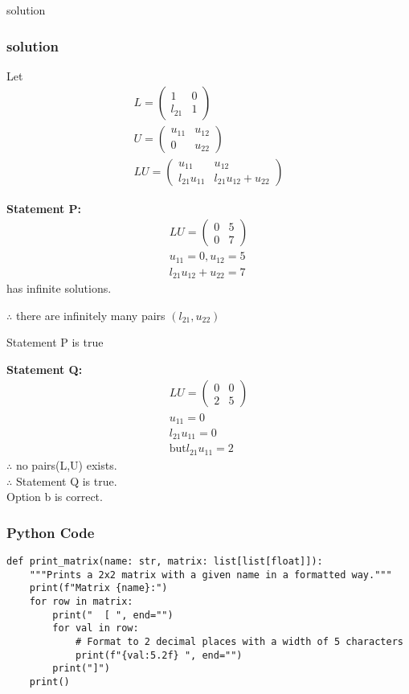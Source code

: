 \documentclass{beamer}
\begin{document}
\begin{frame}{solution}
    \frametitle{solution}
Let 
\begin{align}
L = \begin{pmatrix} 1 & 0 \\ l_{21} & 1 \end{pmatrix}\\
U = \begin{pmatrix} u_{11} & u_{12} \\ 0 & u_{22} \end{pmatrix}\\
LU = \begin{pmatrix} u_{11} & u_{12} \\ l_{21}u_{11} & l_{21}u_{12} + u_{22} \end{pmatrix}
\end{align}
\end{frame}
\begin{frame}
\textbf{Statement P:}
\begin{align}
LU = \begin{pmatrix} 0 & 5 \\ 0 & 7 \end{pmatrix} \\
u_{11} = 0, u_{12} = 5\\
l_{21}u_{12} + u_{22} = 7
\end{align}
has infinite solutions.

$\therefore$ there are infinitely many pairs $(l_{21}, u_{22})$

Statement P is true\\
\end{frame}
\begin{frame}
\textbf{Statement Q:}
\begin{align}
LU = \begin{pmatrix} 0 & 0 \\ 2 & 5 \end{pmatrix}\\
u_{11} = 0\\
l_21u_11=0\\
\text{but} l_21u_11=2
\end{align}
$\therefore$ no pairs(L,U) exists.\\
$\therefore$ Statement Q is true.\\
Option b is correct.
\end{frame}


\begin{frame}[fragile]
\frametitle{Python Code}
\begin{lstlisting}
def print_matrix(name: str, matrix: list[list[float]]):
    """Prints a 2x2 matrix with a given name in a formatted way."""
    print(f"Matrix {name}:")
    for row in matrix:
        print("  [ ", end="")
        for val in row:
            # Format to 2 decimal places with a width of 5 characters
            print(f"{val:5.2f} ", end="")
        print("]")
    print()
\end{lstlisting}
\end{frame}
\end{document}
